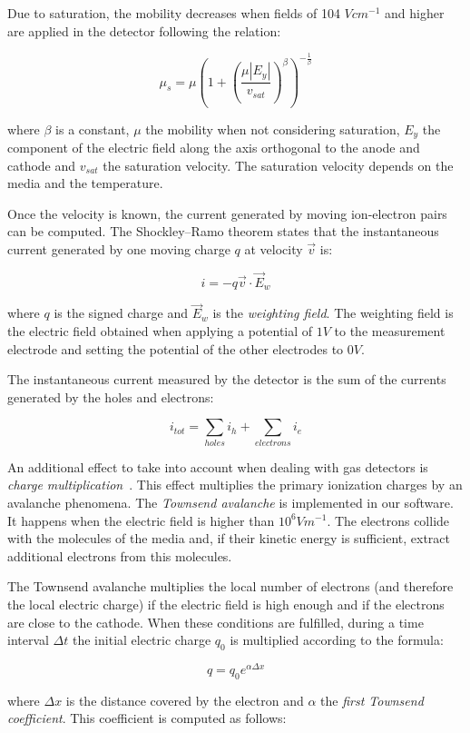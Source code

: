 \documentclass[11pt]{article}
\begin{document}
Due to saturation, the mobility decreases when fields of 104 $V cm^{-1}$ and higher are applied in
the detector following the relation:

\[\mu_s = \mu \left (1 + \left (\frac{\mu |E_y|}{v_{sat}} \right )^{\beta} \right )^{-\frac{1}{\beta}}\]

where $\beta$ is a constant, $\mu$ the mobility when not considering saturation,
$E_y$ the component of the electric field along the axis orthogonal to the anode and cathode
and $v_{sat}$ the saturation velocity. The saturation velocity depends on the
media and the temperature.

Once the velocity is known, the current generated by moving ion-electron
pairs can be computed. The Shockley–Ramo theorem states that the instantaneous current generated
by one moving charge $q$ at velocity $\vec{v}$ is:

\[i = -q \vec{v} \cdot \vec{E}_w\]

where $q$ is the signed charge and $\vec{E}_w$ is the \textit{weighting field}. The weighting field is the electric field
obtained when applying a potential of $1V$ to the measurement electrode and setting
the potential of the other electrodes to $0V$.

The instantaneous current measured
by the detector is the sum of the currents generated by the holes and electrons:

\[i_{tot} = \sum_{holes} i_h + \sum_{electrons} i_e\]

An additional effect to take into account  when dealing with gas detectors is
\textit{charge multiplication}~\cite{lphy2236}. This effect
multiplies the primary ionization charges by an avalanche phenomena.
The \textit{Townsend avalanche} is implemented in our software. It happens
when the electric field is higher than $10^6Vm^{-1}$. The electrons collide
with the molecules of the media and, if their kinetic energy is sufficient,
extract additional electrons from this molecules.

The Townsend avalanche multiplies the local number of electrons (and therefore the local electric
charge) if the electric field is high enough and if the electrons are close
to the cathode. When these conditions are fulfilled, during a time interval
$\Delta t$ the initial electric charge $q_0$ is multiplied
according to the formula:

\[q = q_0 e^{\alpha \Delta x}\]

where $\Delta x$ is the distance covered by the electron and $\alpha$ the
\textit{first Townsend coefficient}. This coefficient is computed as follows:
\end{document}
